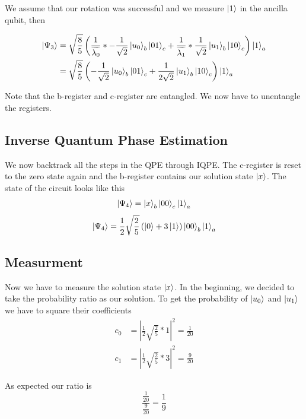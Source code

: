     We assume that our rotation was successful and we measure $\ket{1}$ in the ancilla qubit, then
    

    \begin{equation}
    \begin{split}
    \ket{\Psi_3} &=\sqrt{\frac{8}{5}}\left(\frac {1} {\widetilde{\lambda_0}} *-\frac{1}{\sqrt{2}} \ket{u_0}_b\ket{01}_c +\frac{1}{\widetilde{\lambda_1}}*\frac{1}{\sqrt{2}} \ket{u_1}_b\ket{10}_c\right)\ket{1}_a \\
    &=\sqrt{\frac{8}{5}}\left(-\frac{1}{\sqrt{2}} \ket{u_0}_b\ket{01}_c +\frac{1}{2\sqrt{2}} \ket{u_1}_b\ket{10}_c\right)\ket{1}_a 
    \end{split}
    \end{equation}

    Note that the b-register and c-register are entangled. We now have to unentangle the registers.

\subsection{Inverse Quantum Phase Estimation}
    We now backtrack all the steps in the QPE through IQPE.
    The c-register is reset to the zero state again and the b-register contains our solution state $\ket x$.
    The state of the circuit looks like this
    \begin{equation}
    \ket{\Psi_4}= \ket{x}_b \ket{00}_c \ket{1}_a 
    \end{equation}
    \begin{equation}
    \ket{\Psi_4}=\frac{1}{2}\sqrt{\frac{2}{5}}  \left(\ket{0} +3 \ket{1} \right) \ket{00}_b \ket{1}_a
    \end{equation}

\subsection{Measurment}
    Now we have to measure the solution state $\ket x$.
    In the beginning, we decided to take the probability ratio as our solution. 
    To get the probability of $\ket{u_0}$ and $\ket{u_1}$ we have to square their coefficients
\begin{equation}
\begin{split}
c_0&=\left|\frac{1}{2}\sqrt{\frac{2}{5}}*1\right|^2 = \frac{1}{20}\\
c_1&=\left|\frac{1}{2}\sqrt{\frac{2}{5}}*3\right|^2 = \frac{9}{20}
\end{split}
\end{equation}

As expected our ratio is 
\begin{equation}
 \frac{\frac{1}{20}}{ \frac{9}{20} } = \frac 1 9
\end{equation}

